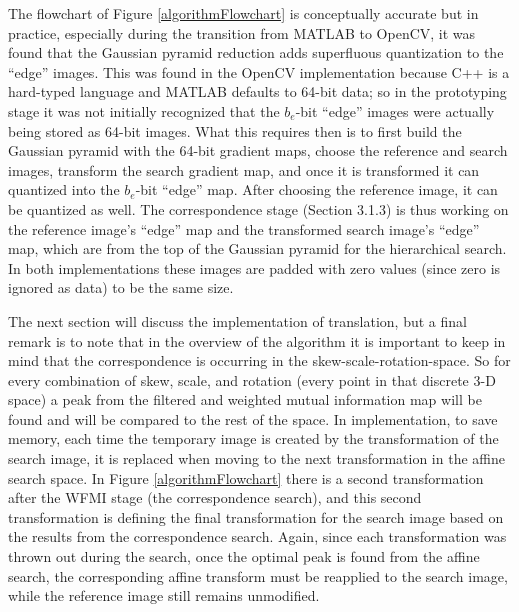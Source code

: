 The flowchart of Figure \ref{algorithmFlowchart} is conceptually accurate but in practice, especially during the transition from MATLAB\textsuperscript{\textregistered} to OpenCV, it was found that the Gaussian pyramid reduction adds superfluous quantization to the ``edge'' images. This was found in the OpenCV implementation because C++ is a hard-typed language and MATLAB\textsuperscript{\textregistered} defaults to 64-bit data; so in the prototyping stage it was not initially recognized that the $b_{e}$-bit ``edge'' images were actually being stored as 64-bit images. What this requires then is to first build the Gaussian pyramid with the 64-bit gradient maps, choose the reference and search images, transform the search gradient map, and once it is transformed it can quantized into the $b_{e}$-bit ``edge'' map. After choosing the reference image, it can be quantized as well. The correspondence stage (Section 3.1.3) is thus working on the reference image's ``edge'' map and the transformed search image's ``edge'' map, which are from the top of the Gaussian pyramid for the hierarchical search. In both implementations these images are padded with zero values (since zero is ignored as data) to be the same size.

The next section will discuss the implementation of translation, but a final remark is to note that in the overview of the algorithm it is important to keep in mind that the correspondence is occurring in the skew-scale-rotation-space. So for every combination of skew, scale, and rotation (every point in that discrete 3-D space) a peak from the filtered and weighted mutual information map will be found and will be compared to the rest of the space. In implementation, to save memory, each time the temporary image is created by the transformation of the search image, it is replaced when moving to the next transformation in the affine search space. In Figure \ref{algorithmFlowchart} there is a second transformation after the WFMI stage (the correspondence search), and this second transformation is defining the final transformation for the search image based on the results from the correspondence search. Again, since each transformation was thrown out during the search, once the optimal peak is found from the affine search, the corresponding affine transform must be reapplied to the search image, while the reference image still remains unmodified.


